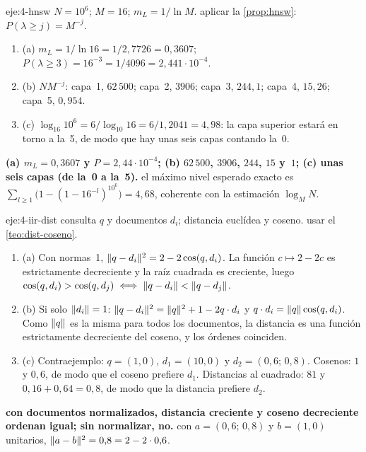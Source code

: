 \begin{solucion}{eje:4-hnsw}
\datos $N=10^{6}$; $M=16$; $m_L=1/\ln M$.
\planteamiento aplicar la \cref{prop:hnsw}: $P(\lambda\ge j)=M^{-j}$.
\pasos
\begin{enumerate}[label=\arabic*.]
  \item (a) $m_L=1/\ln 16=1/2{,}7726=0{,}3607$; $P(\lambda\ge 3)=16^{-3}=1/4096=2{,}441\cdot 10^{-4}$.
  \item (b) $NM^{-j}$: capa~1, $62\,500$; capa~2, $3906$; capa~3, $244{,}1$; capa~4, $15{,}26$; capa~5, $0{,}954$.
  \item (c) $\log_{16}10^{6}=6/\log_{10}16=6/1{,}2041=4{,}98$: la capa superior estará en torno a la~5, de modo que hay unas seis capas contando la~0.
\end{enumerate}
\resultado \textbf{(a) $m_L=0{,}3607$ y $P=2{,}44\cdot 10^{-4}$; (b) $62\,500$, $3906$, $244$, $15$ y~$1$; (c) unas seis capas (de la~0 a la~5).}
\comprobacion el máximo nivel esperado exacto es $\sum_{l\ge 1}\bigl(1-(1-16^{-l})^{10^{6}}\bigr)=4{,}68$, coherente con la estimación $\log_M N$.
\end{solucion}

\begin{solucion}{eje:4-iir-dist}
\datos consulta $q$ y documentos $d_i$; distancia euclídea y coseno.
\planteamiento usar el \cref{teo:dist-coseno}.
\pasos
\begin{enumerate}[label=\arabic*.]
  \item (a) Con normas~1, $\lVert q-d_i\rVert^{2}=2-2\cos(q,d_i)$. La función $c\mapsto 2-2c$ es estrictamente decreciente y la raíz cuadrada es creciente, luego $\cos(q,d_i)>\cos(q,d_j)\iff\lVert q-d_i\rVert<\lVert q-d_j\rVert$.
  \item (b) Si solo $\lVert d_i\rVert=1$: $\lVert q-d_i\rVert^{2}=\lVert q\rVert^{2}+1-2q\cdot d_i$ y $q\cdot d_i=\lVert q\rVert\cos(q,d_i)$. Como $\lVert q\rVert$ es la misma para todos los documentos, la distancia es una función estrictamente decreciente del coseno, y los órdenes coinciden.
  \item (c) Contraejemplo: $q=(1,0)$, $d_1=(10,0)$ y $d_2=(0{,}6;\,0{,}8)$. Cosenos: $1$ y $0{,}6$, de modo que el coseno prefiere $d_1$. Distancias al cuadrado: $81$ y $0{,}16+0{,}64=0{,}8$, de modo que la distancia prefiere $d_2$.
\end{enumerate}
\resultado \textbf{con documentos normalizados, distancia creciente y coseno decreciente ordenan igual; sin normalizar, no.}
\comprobacion con $a=(0{,}6;\,0{,}8)$ y $b=(1,0)$ unitarios, $\lVert a-b\rVert^{2}=0{,}8=2-2\cdot 0{,}6$.
\end{solucion}

